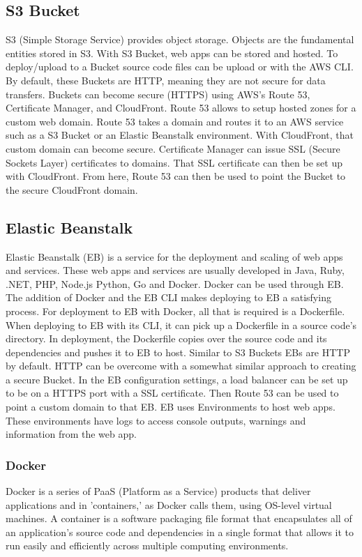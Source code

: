 \subsection{S3 Bucket}
S3 (Simple Storage Service) provides object storage. Objects are the fundamental entities stored in S3. With S3 Bucket, web apps can be stored and hosted. To deploy/upload to a Bucket source code files can be upload or with the AWS CLI. \cite{ref22} By default, these Buckets are HTTP, meaning they are not secure for data transfers. Buckets can become secure (HTTPS) using AWS's Route 53, Certificate Manager, and CloudFront. Route 53 allows to setup hosted zones for a custom web domain. Route 53 takes a domain and routes it to an AWS service such as a S3 Bucket or an Elastic Beanstalk environment. With CloudFront, that custom domain can become secure. Certificate Manager can issue SSL (Secure Sockets Layer) certificates to domains. That SSL certificate can then be set up with CloudFront. From here, Route 53 can then be used to point the Bucket to the secure CloudFront domain.

\subsection{Elastic Beanstalk}
Elastic Beanstalk (EB) is a service for the deployment and scaling of web apps and services. These web apps and services are usually developed in Java, Ruby, .NET, PHP, Node.js Python, Go and Docker. \cite{ref23} Docker can be used through EB. The addition of Docker and the EB CLI makes deploying to EB a satisfying process. For deployment to EB with Docker, all that is required is a Dockerfile. When deploying to EB with its CLI, it can pick up a Dockerfile in a source code's directory. In deployment, the Dockerfile copies over the source code and its dependencies and pushes it to EB to host. Similar to S3 Buckets EBs are HTTP by default. HTTP can be overcome with a somewhat similar approach to creating a secure Bucket. In the EB configuration settings, a load balancer can be set up to be on a HTTPS port with a SSL certificate. Then Route 53 can be used to point a custom domain to that EB. EB uses Environments to host web apps. These environments have logs to access console outputs, warnings and information from the web app.

\subsubsection{Docker}
Docker is a series of PaaS (Platform as a Service) products that deliver applications and in 'containers,' as Docker calls them, using OS-level virtual machines. A container is a software packaging file format that encapsulates all of an application's source code and dependencies in a single format that allows it to run easily and efficiently across multiple computing environments. \cite{ref24}

